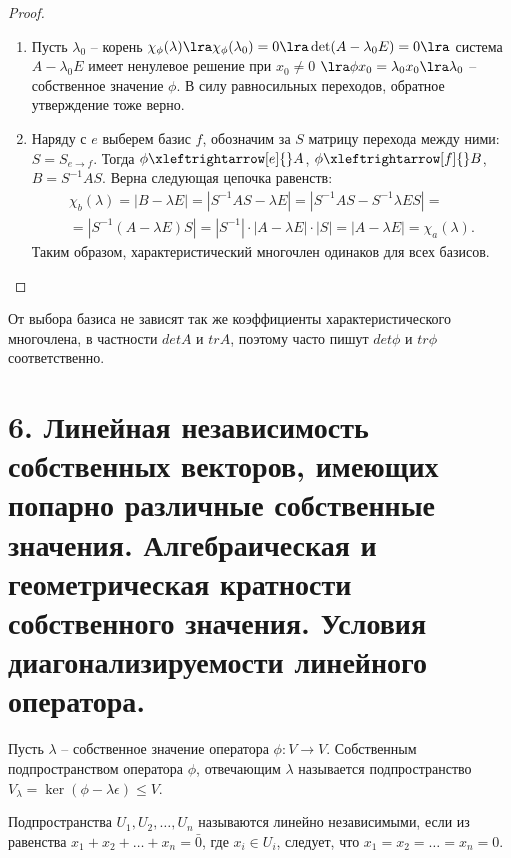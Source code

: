 \begin{proof}
    \begin{enumerate}
        \item Пусть $\lambda_0$ -- корень $\chi_{\phi}(\lambda) \lra \chi_{\phi}(\lambda_0) = 0 \lra \det(A - \lambda_{0}E) = 0 \lra $ система $A - \lambda_{0}E$ имеет ненулевое решение при $x_0 \neq 0$ $\lra \phi x_{0} = \lambda_0 x_0 \lra \lambda_0$ -- собственное значение $\phi$. В силу равносильных переходов, обратное утверждение тоже верно. 
        \item Наряду с $e$ выберем базис $f$, обозначим за $S$ матрицу перехода между ними: 
        $S = S_{e \to f}$. Тогда $\phi \xleftrightarrow[e]{} A$, $\phi \xleftrightarrow[f]{} B$, 
        $B = S^{-1}AS$. Верна следующая цепочка равенств:
        \begin{eqnarray}
            \chi_b(\lambda) = |B - \lambda E| = |S^{-1}AS - \lambda E| 
            = |S^{-1}AS - S^{-1} \lambda E S| = \\ = |S^{-1}(A - \lambda E)S| 
            = |S^{-1}| \cdot |A - \lambda E| \cdot |S| = |A - \lambda E| = \chi_a(\lambda).
        \end{eqnarray}
        Таким образом, характеристический многочлен одинаков для всех базисов.
    \end{enumerate}
\end{proof}

\begin{corollary}
    От выбора базиса не зависят так же коэффициенты характеристического многочлена, в частности $det A$ и $tr A$, поэтому часто пишут $det \phi$ и $tr \phi$ соответственно.
\end{corollary}

\section{6. Линейная независимость собственных векторов, имеющих попарно различные собственные значения. Алгебраическая и геометрическая кратности собственного значения. Условия диагонализируемости линейного оператора.}

\begin{definition}
    Пусть $\lambda$ -- собственное значение оператора $\phi: V \to V$. Собственным подпространством 
    оператора $\phi$, отвечающим $\lambda$ называется подпространство 
    $V_{\lambda} = \ker (\phi - \lambda \epsilon) \leq V$.
\end{definition}

\begin{definition}
    Подпространства $U_1, U_2, \ldots, U_n$ называются линейно независимыми, если из равенства 
    $x_1 + x_2 + \dots + x_n = \bar{0}$, где $x_i \in U_i$, следует, что $x_1 = x_2 = \dots = x_n = 0$.
\end{definition}

